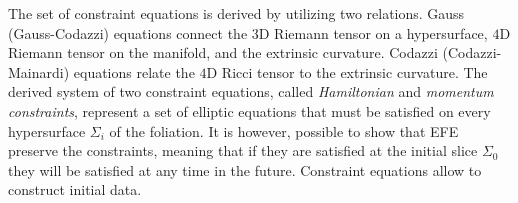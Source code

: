 The set of constraint equations is derived by utilizing two relations.
Gauss (Gauss-Codazzi) equations connect the $3$D Riemann tensor on a hypersurface, 
$4$D Riemann tensor on the manifold, and the extrinsic curvature. 
Codazzi (Codazzi-Mainardi) equations relate the $4$D Ricci tensor to the extrinsic curvature. 
%
%
The derived system of two constraint equations, called 
\textit{Hamiltonian} and \textit{momentum constraints}, 
represent a set of elliptic equations that must be satisfied on 
every hypersurface $\Sigma_i$ of the foliation. 
%
It is however, possible to show that \ac{EFE} preserve the constraints, 
meaning that if they are satisfied at the initial slice $\Sigma_0$ 
they will be satisfied at any time in the future.
%
Constraint equations allow to construct initial data. 



